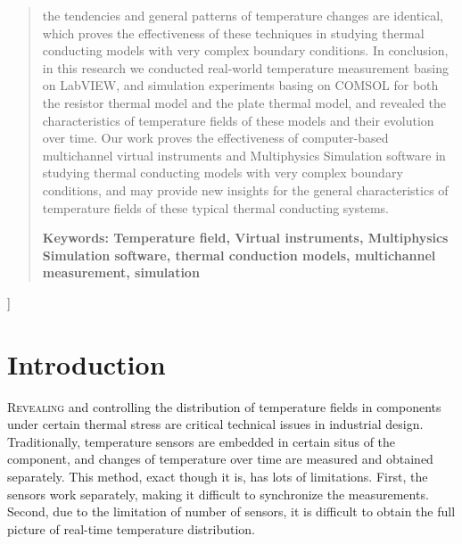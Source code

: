 \documentclass[10pt,a4paper,twocolumn,twoside,UTF8]{article}
\begin{document}
\begin{@twocolumnfalse}
\begin{abstract}
{	the tendencies and general patterns of temperature changes are identical, which proves the effectiveness of these techniques in studying thermal conducting models with very complex boundary conditions.
	In conclusion, in this research we conducted real-world temperature measurement basing on LabVIEW, and simulation experiments basing on COMSOL for both the resistor thermal model and the plate thermal model, 
	and revealed the characteristics of temperature fields of these models and their evolution over time.
    Our work proves the effectiveness of computer-based multichannel virtual instruments and Multiphysics Simulation software in studying thermal conducting models with very complex boundary conditions, 
	and may provide new insights for the general characteristics of temperature fields of these typical thermal conducting systems.
	}
	\par
	\textbf{Keywords: Temperature field, Virtual instruments, Multiphysics Simulation software, thermal conduction models, multichannel measurement, simulation}
	\vspace{2em}
	\end{abstract}
	\end{@twocolumnfalse}
]

\renewcommand{\thefootnote}{\fnsymbol{footnote}}

\thispagestyle{firstpage} 
\pagestyle{maincontent}

\section{Introduction}
\lettrine[lines=2]{R}{evealing} and controlling the distribution of temperature fields in components under certain thermal stress are critical technical issues in industrial design.
Traditionally, temperature sensors are embedded in certain situs of the component, and changes of temperature over time are measured and obtained separately.
This method, exact though it is, has lots of limitations.
First, the sensors work separately, making it difficult to synchronize the measurements.
Second, due to the limitation of number of sensors, it is difficult to obtain the full picture of real-time temperature distribution.
\end{document}

